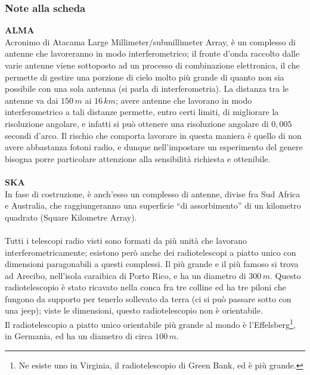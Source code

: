 \subsubsection{Note alla scheda}
\textbf{ALMA}
\\
Acronimo di Atacama Large Millimeter/submillimeter Array, è un complesso di antenne  che lavoreranno in modo interferometrico; il fronte d'onda raccolto dalle varie antenne viene sottoposto ad un processo di combinazione elettronica, il che permette di gestire una porzione di cielo molto più grande di quanto non sia possibile con una sola antenna (si parla di interferometria). La distanza tra le antenne va dai $150 \, m$ ai $16 \, km$; avere antenne che lavorano in modo interferometrico a tali distanze permette, entro certi limiti, di migliorare la risoluzione angolare, e infatti si può ottenere una risoluzione angolare di $0,005$ secondi d'arco. Il rischio che comporta lavorare in questa maniera è quello di non avere abbastanza fotoni radio, e dunque nell'impostare un esperimento del genere bisogna porre particolare attenzione alla sensibilità richiesta e ottenibile.
\\
\\
\textbf{SKA}\\
In fase di costruzione, è anch'esso un complesso di antenne, divise fra Sud Africa e Australia, che raggiungeranno una superficie ``di assorbimento'' di un kilometro quadrato (Square Kilometre Array).
\\
\\
Tutti i telescopi radio visti sono formati da più unità che lavorano interferometricamente; esistono però anche dei radiotelescopi a piatto unico con dimensioni paragonabili a questi complessi. Il più grande e il più famoso si trova ad Arecibo, nell'isola caraibica di Porto Rico, e ha un diametro di $300 \, m$. Questo radiotelescopio è stato ricavato nella conca fra tre colline ed ha tre piloni che fungono da supporto per tenerlo sollevato da terra (ci si può passare sotto con una jeep); viste le dimensioni, questo radiotelescopio non è orientabile.\\%
Il radiotelescopio a piatto unico orientabile  più grande al mondo è l'Effelsberg\footnote{Ne esiste uno in Virginia, il radiotelescopio di Green Bank, ed è più grande.}, in Germania, ed ha un diametro di circa $100 \, m$.


\clearpage


